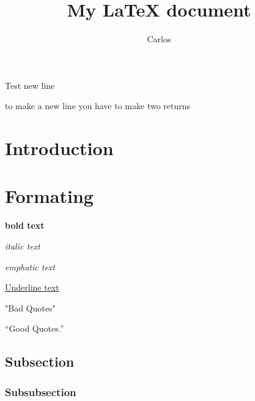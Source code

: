 \documentclass{article}
\author{Carlos}
\title{My { \LaTeX } document}
\begin{document}
\maketitle
Test
new line

to make a new line you have to make two returns

\section{Introduction}
\section{Formating}

\textbf{bold text}

\textit{italic text}

\emph{emphatic text}

\underline{Underline text}

"Bad Quotes"

``Good Quotes.''

\subsection{Subsection}
\subsubsection{Subsubsection}
\end{document}
